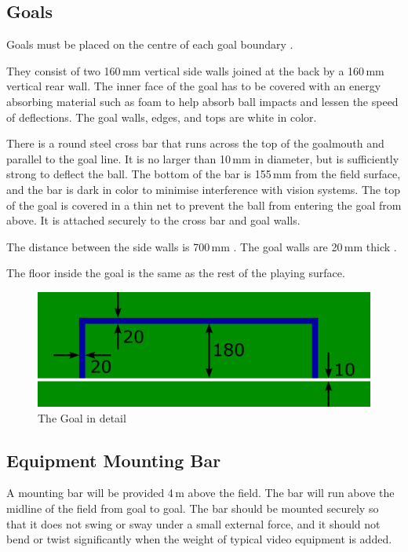 \subsection{Goals}
Goals must be placed on the centre of each goal boundary .

They consist of two 160\,mm vertical side walls joined at the back by a 160\,mm vertical rear wall.
The inner face of the goal has to be covered with an energy absorbing material such as foam to help absorb ball impacts and lessen the speed of deflections.
The goal walls, edges, and tops are white in color.

There is a round steel cross bar that runs across the top of the goalmouth and parallel to the goal line.
It is no larger than 10\,mm in diameter, but is sufficiently strong to deflect the ball.
The bottom of the bar is 155\,mm from the field surface, and the bar is dark in color to minimise interference with vision systems.
The top of the goal is covered in a thin net to prevent the ball from entering the goal from above.
It is attached securely to the cross bar and goal walls.

The distance between the side walls is 700\,mm .
The goal walls are 20\,mm thick .

The floor inside the goal is the same as the rest of the playing surface.


\begin{figure}[ht] %
	\centering
	\includegraphics[width=0.5\columnwidth]{img/goal_detail.png}
	\caption{The Goal in detail}
	\label{fig:sslgoal}
\end{figure}

\subsection{Equipment Mounting Bar}
A mounting bar will be provided 4\,m above the field.
The bar will run above the midline of the field from goal to goal.
The bar should be mounted securely so that it does not swing or sway under a small external force, and it should not bend or twist significantly when the weight of typical video equipment is added.

